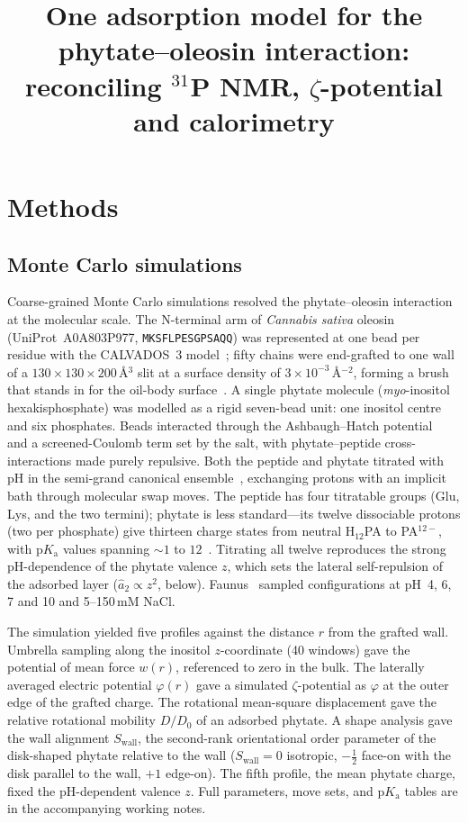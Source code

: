 \documentclass[11pt]{article}
\title{One adsorption model for the phytate--oleosin interaction:\\
       \large reconciling $^{31}$P NMR, $\zeta$-potential and calorimetry}
\author{}
\date{}
\begin{document}
\maketitle

\section{Methods}

\subsection{Monte Carlo simulations}

Coarse-grained Monte Carlo simulations resolved the phytate--oleosin interaction
at the molecular scale.  The N-terminal arm of \textit{Cannabis sativa} oleosin
(UniProt~A0A803P977, \texttt{MKSFLPESGPSAQQ}) was represented at one bead per
residue with the CALVADOS~3 model~\cite{Tesei2021,Cao2024}; fifty chains were
end-grafted to one wall of a $130\times130\times200$\,\AA$^{3}$ slit at a surface
density of $3\times10^{-3}$\,\AA$^{-2}$, forming a brush that stands in for the
oil-body surface~\cite{Tzen1992}.  A single phytate molecule
(\textit{myo}-inositol hexakisphosphate) was modelled as a rigid seven-bead unit:
one inositol centre and six phosphates.  Beads interacted through the
Ashbaugh--Hatch potential~\cite{Ashbaugh2008} and a screened-Coulomb term set by
the salt, with phytate--peptide cross-interactions made purely repulsive.  Both
the peptide and phytate titrated with pH in the semi-grand canonical
ensemble~\cite{SmithTriska1994}, exchanging protons with an implicit bath through
molecular swap moves.  The peptide has four titratable groups (Glu, Lys, and the
two termini); phytate is less standard---its twelve dissociable protons (two per
phosphate) give thirteen charge states from neutral H$_{12}$PA to PA$^{12-}$, with
p$K_\text{a}$ values spanning $\sim\!1$ to $12$~\cite{DeStefano2003,Grimsley2009}.
Titrating all twelve reproduces the strong pH-dependence of the phytate valence
$z$, which sets the lateral self-repulsion of the adsorbed layer
($\hat a_2\propto z^2$, below).  Faunus~\cite{Stenqvist2013} sampled
configurations at pH~4, 6, 7 and 10 and 5--150\,mM NaCl.

The simulation yielded five profiles against the distance $r$ from the grafted
wall.  Umbrella sampling along the inositol $z$-coordinate (40 windows) gave the
potential of mean force $w(r)$, referenced to zero in the bulk.  The laterally
averaged electric potential $\varphi(r)$ gave a simulated $\zeta$-potential as
$\varphi$ at the outer edge of the grafted charge.  The rotational mean-square
displacement gave the relative rotational mobility $D/D_0$ of an adsorbed phytate.
A shape analysis gave the wall alignment $S_\text{wall}$, the second-rank
orientational order parameter of the disk-shaped phytate relative to the wall
($S_\text{wall}=0$ isotropic, $-\tfrac12$ face-on with the disk parallel to the
wall, $+1$ edge-on).  The fifth profile, the mean phytate charge, fixed the
pH-dependent valence $z$.  Full parameters, move sets, and p$K_\text{a}$ tables are
in the accompanying working notes.
\end{document}
